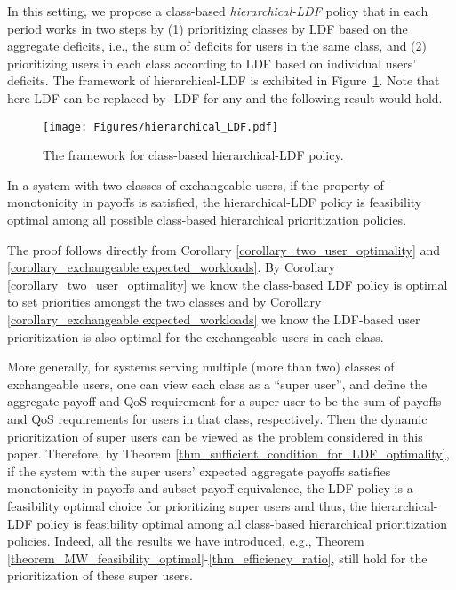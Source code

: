 \documentclass[prodmode,acmtompecs]{acmsmall}
\begin{document}
In this setting, we propose a class-based {\em hierarchical-LDF} policy that in each period works in two steps by (1) prioritizing classes by LDF based on the aggregate deficits, i.e., the sum of deficits for users in the same class, and (2) prioritizing users in each class according to LDF based on individual users' deficits. 
The framework of hierarchical-LDF is exhibited in Figure{~\ref{fig_hierarchical_LDF}}. 
Note that here LDF can be replaced by -LDF for any  and the following result would hold. 

\begin{figure}[htp]
  \centering
  \texttt{[image: Figures/hierarchical\_LDF.pdf]}
  \caption{The framework for class-based hierarchical-LDF policy. }
  \label{fig_hierarchical_LDF}
\end{figure} 

\begin{theorem}
\label{thm_optimality_hierarchical_LDF}
In a system with two classes of exchangeable users, if the property of monotonicity in payoffs is satisfied, the hierarchical-LDF policy is feasibility optimal among all possible class-based hierarchical prioritization policies. 
\end{theorem}

The proof follows directly from Corollary \ref{corollary_two_user_optimality} and \ref{corollary_exchangeable expected_workloads}. By Corollary \ref{corollary_two_user_optimality} we know the class-based LDF policy is optimal to set priorities amongst the two classes and by Corollary \ref{corollary_exchangeable expected_workloads} we know the LDF-based user prioritization is also optimal for the exchangeable users in each class. 

More generally, for systems serving multiple (more than two) classes of exchangeable users, 
one can view each class as a ``super user'', and define the aggregate payoff and QoS requirement for a super user to be the sum of payoffs and QoS requirements for users in that class, respectively. 
Then the dynamic prioritization of super users can be viewed as the problem considered in this paper. Therefore, by Theorem \ref{thm_sufficient_condition_for_LDF_optimality}, if the system with the super users' expected aggregate payoffs satisfies monotonicity in payoffs and subset payoff equivalence, the LDF policy is a feasibility optimal choice for prioritizing super users and thus, the hierarchical-LDF policy is feasibility optimal among all class-based hierarchical prioritization policies. 
Indeed, all the results we have introduced, e.g., Theorem \ref{theorem_MW_feasibility_optimal}-\ref{thm_efficiency_ratio}, still hold for the prioritization of these super users. 
\end{document}

